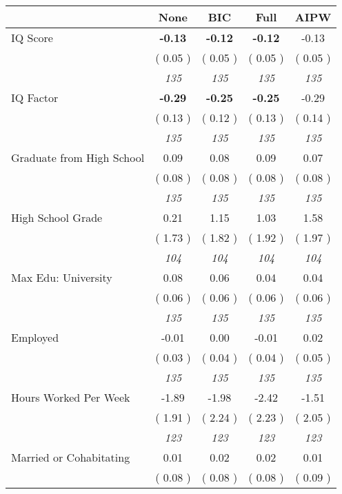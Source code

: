 \begin{tabular}{l c c c c}
\toprule
 & None & BIC & Full & AIPW \\
\midrule
IQ Score & \textbf{     -0.13 } & \textbf{     -0.12 } & \textbf{     -0.12 } &     -0.13 \\
& (     0.05 ) & (     0.05 ) & (     0.05 ) & (     0.05 ) \\
& \textit{ 135 } & \textit{ 135 } & \textit{ 135 } & \textit{ 135 } \\
IQ Factor & \textbf{     -0.29 } & \textbf{     -0.25 } & \textbf{     -0.25 } &     -0.29 \\
& (     0.13 ) & (     0.12 ) & (     0.13 ) & (     0.14 ) \\
& \textit{ 135 } & \textit{ 135 } & \textit{ 135 } & \textit{ 135 } \\
Graduate from High School &      0.09 &      0.08 &      0.09 &      0.07 \\
& (     0.08 ) & (     0.08 ) & (     0.08 ) & (     0.08 ) \\
& \textit{ 135 } & \textit{ 135 } & \textit{ 135 } & \textit{ 135 } \\
High School Grade &      0.21 &      1.15 &      1.03 &      1.58 \\
& (     1.73 ) & (     1.82 ) & (     1.92 ) & (     1.97 ) \\
& \textit{ 104 } & \textit{ 104 } & \textit{ 104 } & \textit{ 104 } \\
Max Edu: University &      0.08 &      0.06 &      0.04 &      0.04 \\
& (     0.06 ) & (     0.06 ) & (     0.06 ) & (     0.06 ) \\
& \textit{ 135 } & \textit{ 135 } & \textit{ 135 } & \textit{ 135 } \\
Employed &     -0.01 &      0.00 &     -0.01 &      0.02 \\
& (     0.03 ) & (     0.04 ) & (     0.04 ) & (     0.05 ) \\
& \textit{ 135 } & \textit{ 135 } & \textit{ 135 } & \textit{ 135 } \\
Hours Worked Per Week &     -1.89 &     -1.98 &     -2.42 &     -1.51 \\
& (     1.91 ) & (     2.24 ) & (     2.23 ) & (     2.05 ) \\
& \textit{ 123 } & \textit{ 123 } & \textit{ 123 } & \textit{ 123 } \\
Married or Cohabitating &      0.01 &      0.02 &      0.02 &      0.01 \\
& (     0.08 ) & (     0.08 ) & (     0.08 ) & (     0.09 ) \\

\end{tabular}
